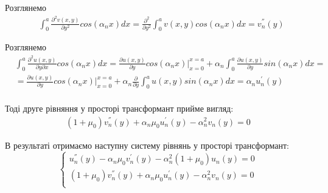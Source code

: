 \documentclass[a4paper,14pt]{extarticle}
\numberwithin{equation}{section}
\begin{document}
Розглянемо
\begin{align*}
    &\int_{0}^{a} \frac{\partial^2 v(x,y)}{\partial y^2} cos(\alpha_n x)dx = \frac{\partial^2}{\partial y^2} \int_{0}^{a} v(x,y) cos(\alpha_n x)dx = v_n^{''}(y)
\end{align*}

Розглянемо
\begin{align*}
    &\int_{0}^{a} \frac{\partial^2 u(x,y)}{\partial y \partial x} cos(\alpha_n x)dx = \frac{\partial u(x,y)}{\partial y} cos(\alpha_n x) |_{x=0}^{x=a} + \alpha_n \int_{0}^{a} \frac{\partial u(x,y)}{\partial y} sin(\alpha_n x) dx = \\
    &=\frac{\partial u(x,y)}{\partial y} cos(\alpha_n x) |_{x=0}^{x=a} + \alpha_n \frac{\partial}{\partial y} \int_{0}^{a} u(x,y) sin(\alpha_n x) dx = \alpha_n u_n^{'}(y)\\
\end{align*}

Тоді друге рівняння у просторі трансформант прийме вигляд:
\begin{align*}
    (1 + \mu_0) v_n^{''}(y) + \alpha_n \mu_0 u_n^{'}(y)  - \alpha_n^2 v_n(y) = 0
\end{align*}

В результаті отримаємо наступну систему рівнянь у просторі трансформант:
\begin{equation*}
    \begin{cases}
        u_n^{''}(y) - \alpha_n \mu_0 v_n^{'}(y) - \alpha_n^2 (1 + \mu_0) u_n(y) = 0 \\
        (1 + \mu_0) v_n^{''}(y) + \alpha_n \mu_0 u_n^{'}(y)  - \alpha_n^2 v_n(y) = 0 \\
    \end{cases}
\end{equation*}
\end{document}
